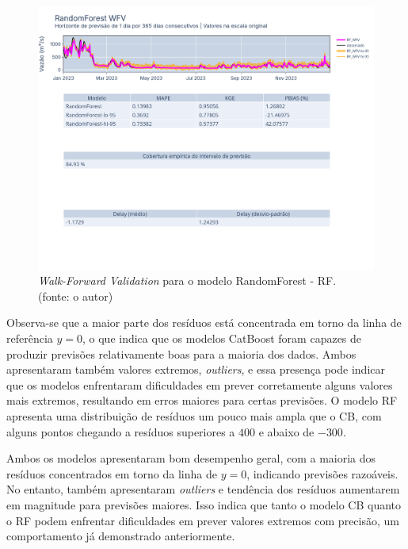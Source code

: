\begin{figure}[!h]
\centering
\includegraphics[scale=0.33]{Figuras/jequiti/resultados/RF_WFV_ORIG.png}
\caption{\textit{Walk-Forward Validation} para o modelo RandomForest - RF.\\(fonte: o autor)}
\label{fig:jequiti_RF_WFV_ORIG}
\end{figure}
\clearpage

Observa-se que a maior parte dos resíduos está concentrada em torno da linha de referência $y=0$, o que indica que os modelos CatBoost foram capazes de produzir previsões relativamente boas para a maioria dos dados. Ambos apresentaram também valores extremos, \textit{outliers}, e essa presença pode indicar que os modelos enfrentaram dificuldades em prever corretamente alguns valores mais extremos, resultando em erros maiores para certas previsões. O modelo RF apresenta uma distribuição de resíduos um pouco mais ampla que o CB, com alguns pontos chegando a resíduos superiores a $400$ e abaixo de $-300$.

Ambos os modelos apresentaram bom desempenho geral, com a maioria dos resíduos concentrados em torno da linha de $y=0$, indicando previsões razoáveis. No entanto, também apresentaram \textit{outliers} e tendência dos resíduos aumentarem em magnitude para previsões maiores. Isso indica que tanto o modelo CB quanto o RF podem enfrentar dificuldades em prever valores extremos com precisão, um comportamento já demonstrado anteriormente.

